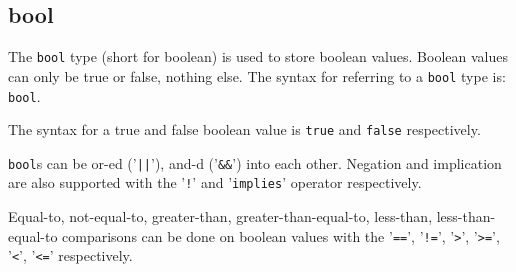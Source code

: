 
\subsection{bool}
{
	The \texttt{bool} type (short for boolean) is used to store boolean values.
	Boolean values can only be true or false, nothing else.
	The syntax for referring to a \texttt{bool} type is: \texttt{bool}.
	
	The syntax for a true and false boolean value is \texttt{true} and
	\texttt{false} respectively.
	
	\texttt{bool}s can be or-ed ('\texttt{||}'),
	and-d ('\texttt{\&\&}') into each
	other. Negation and implication are also supported
	with the '\texttt{!}' and '\texttt{implies}' operator respectively.
	
	Equal-to, not-equal-to, greater-than, greater-than-equal-to,
	less-than, less-than-equal-to comparisons can be done on boolean values with
	the '\texttt{==}', '\texttt{!=}',
	'\texttt{>}', '\texttt{>=}', '\texttt{<}', '\texttt{<=}' respectively.
}
